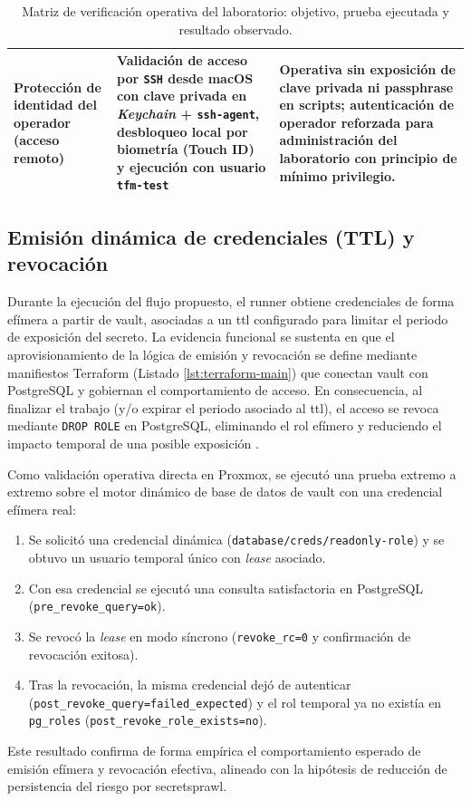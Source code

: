 \documentclass[runningheads]{llncs}
\begin{document}
\begin{table}[htbp]
\begin{tabular}{>{\raggedright\arraybackslash}p{} >{\raggedright\arraybackslash}p{} >{\raggedright\arraybackslash}p{}}
\addlinespace
Protección de identidad del operador (acceso remoto) &
Validación de acceso por \texttt{SSH} desde macOS con clave privada en \textit{Keychain} + \texttt{ssh-agent}, desbloqueo local por biometría (Touch ID) y ejecución con usuario \texttt{tfm-test} &
Operativa sin exposición de clave privada ni passphrase en scripts; autenticación de operador reforzada para administración del laboratorio con principio de mínimo privilegio. \\
\bottomrule
\end{tabular}
\caption{Matriz de verificación operativa del laboratorio: objetivo, prueba ejecutada y resultado observado.}
\label{tab:verificacion-operativa}
\end{table}

\subsection{Emisión dinámica de credenciales (TTL) y revocación}
Durante la ejecución del flujo propuesto, el runner obtiene credenciales de forma efímera a partir de \gls{vault}, asociadas a un \gls{ttl} configurado para limitar el periodo de exposición del secreto. La evidencia funcional se sustenta en que el aprovisionamiento de la lógica de emisión y revocación se define mediante manifiestos Terraform (Listado \ref{lst:terraform-main}) que conectan \gls{vault} con PostgreSQL y gobiernan el comportamiento de acceso. En consecuencia, al finalizar el trabajo (y/o expirar el periodo asociado al \gls{ttl}), el acceso se revoca mediante \texttt{DROP ROLE} en PostgreSQL, eliminando el rol efímero y reduciendo el impacto temporal de una posible exposición \parencite{vault_database_secrets_engine}.

Como validación operativa directa en Proxmox, se ejecutó una prueba extremo a extremo sobre el motor dinámico de base de datos de \gls{vault} con una credencial efímera real:
\begin{enumerate}
    \item Se solicitó una credencial dinámica (\texttt{database/creds/readonly-role}) y se obtuvo un usuario temporal único con \textit{lease} asociado.
    \item Con esa credencial se ejecutó una consulta satisfactoria en PostgreSQL (\texttt{pre\_revoke\_query=ok}).
    \item Se revocó la \textit{lease} en modo síncrono (\texttt{revoke\_rc=0} y confirmación de revocación exitosa).
    \item Tras la revocación, la misma credencial dejó de autenticar (\texttt{post\_revoke\_query=failed\_expected}) y el rol temporal ya no existía en \texttt{pg\_roles} (\texttt{post\_revoke\_role\_exists=no}).
\end{enumerate}
Este resultado confirma de forma empírica el comportamiento esperado de emisión efímera y revocación efectiva, alineado con la hipótesis de reducción de persistencia del riesgo por \gls{secretsprawl}.
\end{document}
